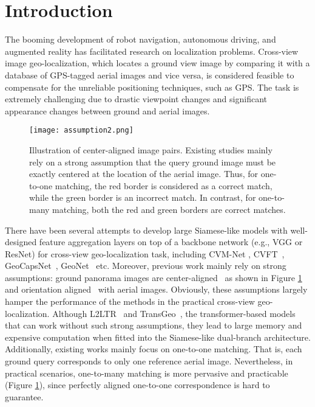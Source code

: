 \documentclass[sn-basic,iicol]{sn-jnl}
\theoremstyle{thmstyletwo}\newtheorem{example}{Example}\newtheorem{remark}{Remark}
\theoremstyle{thmstylethree}\newtheorem{definition}{Definition}
\begin{document}





\maketitle

\section{Introduction}\label{sec1}


The booming development of robot navigation, autonomous driving, and augmented reality has facilitated research on localization problems. Cross-view image geo-localization, which locates a ground view image by comparing it with a database of GPS-tagged aerial images and vice versa, is considered feasible to compensate for the unreliable positioning techniques, such as GPS. The task is extremely challenging due to drastic viewpoint changes and significant appearance changes between ground and aerial images.


\begin{figure}
\setlength{\abovecaptionskip}{0.2cm}
\centering
\texttt{[image: assumption2.png]}
\caption{Illustration of center-aligned image pairs. Existing studies mainly rely on a strong assumption that the query ground image must be exactly centered at the location of the aerial image. Thus, for one-to-one matching, the red border is considered as a correct match, while the green border is an incorrect match. In contrast, for one-to-many matching, both the red and green borders are correct matches.} 
\label{aligned image pairs}
\vspace{-12pt}
\end{figure}

There have been several attempts to develop large Siamese-like models with well-designed feature aggregation layers on top of a backbone network (e.g., VGG or ResNet) for cross-view geo-localization task, including CVM-Net \citep{hu2018cvm}, CVFT~\citep{CVFT2020}, GeoCapsNet~\citep{sun2019geocapsnet}, GeoNet~\citep{zhu2021geographic} etc. Moreover, previous work mainly rely on strong assumptions: ground panorama images are center-aligned~\citep{SAFA2019,DSM2020,wang2021LPN} as shown in Figure \ref{aligned image pairs} and orientation aligned~\citep{liu2019lending} with aerial images. Obviously, these assumptions largely hamper the performance of the methods in the practical cross-view geo-localization. Although L2LTR~\citep{L2LTR2021} and TransGeo~\citep{zhu2022transgeo}, the transformer-based models that can work without such strong assumptions, they lead to large memory and expensive computation when fitted into the Siamese-like dual-branch architecture.
Additionally, existing works mainly focus on one-to-one matching. That is, each ground query corresponds to only one reference aerial image. Nevertheless, in practical scenarios, one-to-many matching is more pervasive and practicable (Figure \ref{aligned image pairs}), since perfectly aligned one-to-one correspondence is hard to guarantee. 
\end{document}
